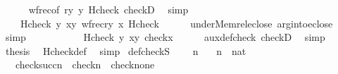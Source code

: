 \begin{isabellebody}
\ \ \ \ \isamarkupfalse%
\ wfrec{\isacharbrackleft}{\kern0pt}of\ {\isachardoublequoteopen}{\isacharquery}{\kern0pt}r{\isacharparenleft}{\kern0pt}y{\isacharparenright}{\kern0pt}{\isachardoublequoteclose}\ y\ {\isachardoublequoteopen}Hcheck{\isachardoublequoteclose}{\isacharbrackright}{\kern0pt}\ checkD\ \isamarkupfalse%
\ simp\isanewline
\ \ \isamarkupfalse%
\ \isanewline
\ \ \isamarkupfalse%
\ {\isachardoublequoteopen}\ {\isachardot}{\kern0pt}{\isachardot}{\kern0pt}{\isachardot}{\kern0pt}\ {\isacharequal}{\kern0pt}\ Hcheck{\isacharparenleft}{\kern0pt}\ y{\isacharcomma}{\kern0pt}\ {\isasymlambda}x{\isasymin}y{\isachardot}{\kern0pt}\ wfrec{\isacharparenleft}{\kern0pt}{\isacharquery}{\kern0pt}r{\isacharparenleft}{\kern0pt}y{\isacharparenright}{\kern0pt}{\isacharcomma}{\kern0pt}\ x{\isacharcomma}{\kern0pt}\ Hcheck{\isacharparenright}{\kern0pt}{\isacharparenright}{\kern0pt}{\isachardoublequoteclose}\isanewline
\ \ \ \ \isamarkupfalse%
\ under{\isacharunderscore}{\kern0pt}Memrel{\isacharunderscore}{\kern0pt}eclose\ arg{\isacharunderscore}{\kern0pt}into{\isacharunderscore}{\kern0pt}eclose\ \isamarkupfalse%
\ simp\isanewline
\ \ \isamarkupfalse%
\ \isanewline
\ \ \isamarkupfalse%
\ {\isachardoublequoteopen}\ {\isachardot}{\kern0pt}{\isachardot}{\kern0pt}{\isachardot}{\kern0pt}\ {\isacharequal}{\kern0pt}\ Hcheck{\isacharparenleft}{\kern0pt}\ y{\isacharcomma}{\kern0pt}\ {\isasymlambda}x{\isasymin}y{\isachardot}{\kern0pt}\ check{\isacharparenleft}{\kern0pt}x{\isacharparenright}{\kern0pt}{\isacharparenright}{\kern0pt}{\isachardoublequoteclose}\isanewline
\ \ \ \ \isamarkupfalse%
\ aux{\isacharunderscore}{\kern0pt}def{\isacharunderscore}{\kern0pt}check\ checkD\ \isamarkupfalse%
\ simp\isanewline
\ \ \isamarkupfalse%
\ \isamarkupfalse%
\ {\isacharquery}{\kern0pt}thesis\ \isamarkupfalse%
\ Hcheck{\isacharunderscore}{\kern0pt}def\ \isamarkupfalse%
\ simp\isanewline
{}\isamarkupfalse%
%
\endisatagproof
{\isafoldproof}%
%
\isadelimproof
\isanewline
%
\endisadelimproof
\isanewline
\isanewline
{}\isamarkupfalse%
\ def{\isacharunderscore}{\kern0pt}checkS\ {\isacharcolon}{\kern0pt}\isanewline
\ \ \ n\isanewline
\ \ \ {\isachardoublequoteopen}n\ {\isasymin}\ nat{\isachardoublequoteclose}\isanewline
\ \ \ {\isachardoublequoteopen}check{\isacharparenleft}{\kern0pt}succ{\isacharparenleft}{\kern0pt}n{\isacharparenright}{\kern0pt}{\isacharparenright}{\kern0pt}\ {\isacharequal}{\kern0pt}\ check{\isacharparenleft}{\kern0pt}n{\isacharparenright}{\kern0pt}\ {\isasymunion}\ {\isacharbraceleft}{\kern0pt}{\isasymlangle}check{\isacharparenleft}{\kern0pt}n{\isacharparenright}{\kern0pt}{\isacharcomma}{\kern0pt}one{\isasymrangle}{\isacharbraceright}{\kern0pt}{\isachardoublequoteclose}\isanewline

\end{isabellebody}
